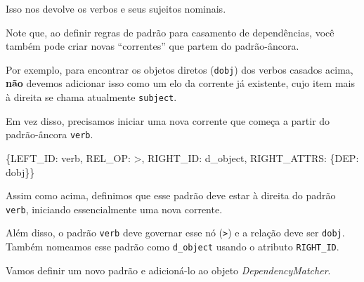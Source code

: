 \documentclass[
  brazilian,
]{article}
\newenvironment{Shaded}{}{}
\newcommand{\NormalTok}[1]{#1}
\newcommand{\StringTok}[1]{\textcolor[rgb]{0.25,0.44,0.63}{#1}}
\begin{document}
Isso nos devolve os verbos e seus sujeitos nominais.

Note que, ao definir regras de padrão para casamento de dependências,
você também pode criar novas ``correntes'' que partem do padrão-âncora.

Por exemplo, para encontrar os objetos diretos (\texttt{dobj}) dos
verbos casados acima, \textbf{não} devemos adicionar isso como um elo da
corrente já existente, cujo item mais à direita se chama atualmente
\texttt{subject}.

Em vez disso, precisamos iniciar uma nova corrente que começa a partir
do padrão-âncora \texttt{verb}.

\begin{Shaded}
\begin{Highlighting}[]
\NormalTok{\{}\StringTok{\textquotesingle{}LEFT\_ID\textquotesingle{}}\NormalTok{: }\StringTok{\textquotesingle{}verb\textquotesingle{}}\NormalTok{, }\StringTok{\textquotesingle{}REL\_OP\textquotesingle{}}\NormalTok{: }\StringTok{\textquotesingle{}\textgreater{}\textquotesingle{}}\NormalTok{, }\StringTok{\textquotesingle{}RIGHT\_ID\textquotesingle{}}\NormalTok{: }\StringTok{\textquotesingle{}d\_object\textquotesingle{}}\NormalTok{, }\StringTok{\textquotesingle{}RIGHT\_ATTRS\textquotesingle{}}\NormalTok{: \{}\StringTok{\textquotesingle{}DEP\textquotesingle{}}\NormalTok{: }\StringTok{\textquotesingle{}dobj\textquotesingle{}}\NormalTok{\}\}}
\end{Highlighting}
\end{Shaded}

Assim como acima, definimos que esse padrão deve estar à direita do
padrão \texttt{verb}, iniciando essencialmente uma nova corrente.

Além disso, o padrão \texttt{verb} deve governar esse nó
(\texttt{\textgreater{}}) e a relação deve ser \texttt{dobj}. Também
nomeamos esse padrão como \texttt{d\_object} usando o atributo
\texttt{RIGHT\_ID}.

Vamos definir um novo padrão e adicioná-lo ao objeto
\emph{DependencyMatcher}.
\end{document}
